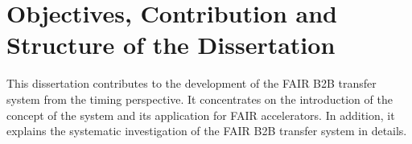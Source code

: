 %
%
%
%

\section{Objectives, Contribution and Structure of the Dissertation}
This dissertation contributes to the development of the FAIR B2B transfer system from the timing perspective. It concentrates on the introduction of the concept of the system and its application for FAIR accelerators. In addition, it explains the systematic investigation of the FAIR B2B transfer system in details.

